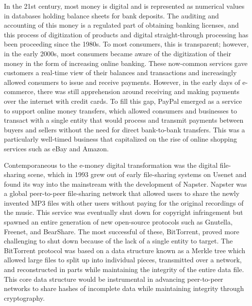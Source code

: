 
In the 21st century, most money is digital and is represented as numerical
values in databases holding balance sheets for bank deposits. The auditing and
accounting of this money is a regulated part of obtaining banking licenses, and
this process of digitization of products and digital straight-through processing
has been proceeding since the 1980s. To most consumers, this is transparent;
however, in the early 2000s, most consumers became aware of the digitization of
their money in the form of increasing online banking. These now-common services
gave customers a real-time view of their balances and transactions and
increasingly allowed consumers to issue and receive payments. However, in the
early days of e-commerce, there was still apprehension around receiving and
making payments over the internet with credit cards. To fill this gap, PayPal
emerged as a service to support online money transfers, which allowed consumers
and businesses to transact with a single entity that would process and transmit
payments between buyers and sellers without the need for direct bank-to-bank
transfers. This was a particularly well-timed business that capitalized on the
rise of online shopping services such as eBay and Amazon.


Contemporaneous to the e-money digital transformation was the digital
file-sharing scene, which in 1993 grew out of early file-sharing systems on
Usenet and found its way into the mainstream with the development of  Napster.
Napster was a global peer-to-peer file-sharing network that allowed users to
share the newly invented MP3 files with other users without paying for the
original recordings of the music. This service was eventually shut down for
copyright infringement but spawned an entire generation of new open-source
protocols such as Gnutella, Freenet, and BearShare. The most successful of
these, BitTorrent, proved more challenging to shut down because of the lack of a
single entity to target. The BitTorrent protocol was based on a data structure
known as a Merkle tree which allowed large files to split up into individual
pieces, transmitted over a network, and reconstructed in parts while maintaining
the integrity of the entire data file. This core data structure would be
instrumental in advancing peer-to-peer networks to share hashes of incomplete
data while maintaining integrity through cryptography.


